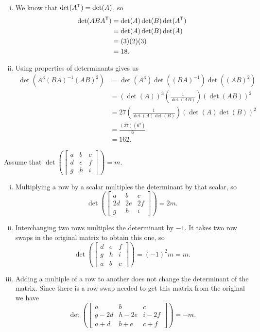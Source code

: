 \begin{example}
\begin{enumerate}[i.]
		\item We know that $\det(A^{\mathsf{T}}) = \det(A)$, so 
\begin{align*}
 \det(ABA^{\mathsf{T}}) &= \det(A) \det(B) \det(A^{\mathsf{T}}) \\
 	&= \det(A) \det(B) \det(A) \\
	&= (3)(2)(3) \\
	&= 18.
\end{align*}

		\item  Using properties of determinants gives us 
\begin{align*}
\det(A^3(BA)^{-1}(AB)^2) &= \det(A^3)\det((BA)^{-1}) \det((AB)^2) \\
	&= (\det(A))^3 \left(\frac{1}{\det(AB)}\right) (\det(AB))^2 \\
	&= 27 \left(\frac{1}{\det(A) \det(B)} \right) (\det(A)\det(B))^2 \\
	&= \frac{(27)(6^2)}{6} \\
	&= 162.
\end{align*}
		\end{enumerate}
	
	\item Assume that $\det\left(\left[ \begin{array}{ccc} a&b&c\\d&e&f\\g&h&i\end{array} \right] \right) = m$. 
		\begin{enumerate}[i.]
		\item Multiplying a row by a scalar multiples the determinant by that scalar, so 
\[\det\left( \left[ \begin{array}{ccc} a&b&c\\2d&2e&2f\\g&h&i\end{array} \right] \right) = 2m.\]

		\item Interchanging two rows multiples the determinant by $-1$. It takes two row swaps in the original matrix to obtain this one, so 
\[\det\left( \left[ \begin{array}{ccc} d&e&f\\g&h&i\\a&b&c\end{array} \right] \right) = (-1)^2m = m.\]

		\item Adding a multiple of a row to another does not change the determinant of the matrix. Since there is a row swap needed to get this matrix from the original we have  
\[\det\left(\left[ \begin{array}{ccc} a&b&c\\g-2d&h-2e&i-2f\\a+d&b+e&c+f \end{array} \right]\right) = -m.\]

		\end{enumerate}

	\ea
	
\end{example}

